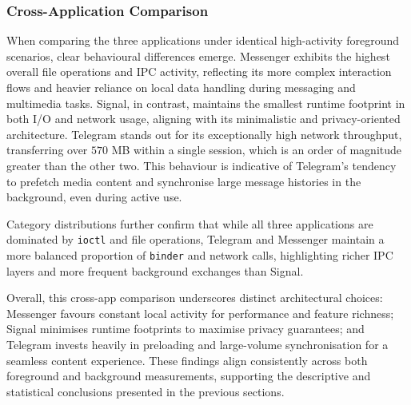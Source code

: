 \documentclass[a4paper,12pt]{report}
\begin{document}
\subsubsection{Cross-Application Comparison}

When comparing the three applications under identical high-activity foreground scenarios, clear behavioural differences emerge. Messenger exhibits the highest overall file operations and IPC activity, reflecting its more complex interaction flows and heavier reliance on local data handling during messaging and multimedia tasks. Signal, in contrast, maintains the smallest runtime footprint in both I/O and network usage, aligning with its minimalistic and privacy-oriented architecture. Telegram stands out for its exceptionally high network throughput, transferring over $570$ MB within a single session, which is an order of magnitude greater than the other two. This behaviour is indicative of Telegram’s tendency to prefetch media content and synchronise large message histories in the background, even during active use.

Category distributions further confirm that while all three applications are dominated by \texttt{ioctl} and file operations, Telegram and Messenger maintain a more balanced proportion of \texttt{binder} and network calls, highlighting richer IPC layers and more frequent background exchanges than Signal.

Overall, this cross-app comparison underscores distinct architectural choices: Messenger favours constant local activity for performance and feature richness; Signal minimises runtime footprints to maximise privacy guarantees; and Telegram invests heavily in preloading and large-volume synchronisation for a seamless content experience. These findings align consistently across both foreground and background measurements, supporting the descriptive and statistical conclusions presented in the previous sections.
\end{document}
